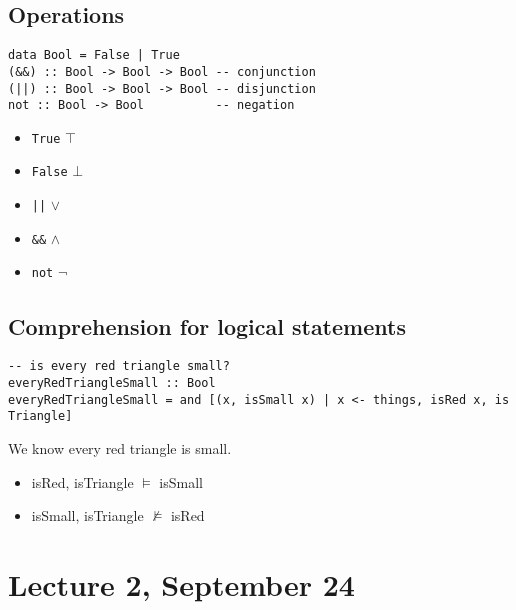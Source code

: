 \documentclass{article}
\begin{document}
\subsection{Operations}
\begin{verbatim}
data Bool = False | True
(&&) :: Bool -> Bool -> Bool -- conjunction
(||) :: Bool -> Bool -> Bool -- disjunction
not :: Bool -> Bool          -- negation
\end{verbatim}
\begin{itemize}
    \item \texttt{True} $\top$
    \item \texttt{False} $\bot$
    \item \texttt{||} $\vee$
    \item \texttt{\&\&} $\wedge$
    \item \texttt{not} $\neg$
\end{itemize}
\subsection{Comprehension for logical statements}
\begin{verbatim}
-- is every red triangle small?
everyRedTriangleSmall :: Bool
everyRedTriangleSmall = and [(x, isSmall x) | x <- things, isRed x, is Triangle]
\end{verbatim}
We know every red triangle is small.
\begin{itemize}
    \item isRed, isTriangle $\vDash$ isSmall
    \item isSmall, isTriangle $\not\vDash$ isRed
\end{itemize}
\section{Lecture 2, September 24}
\end{document}
